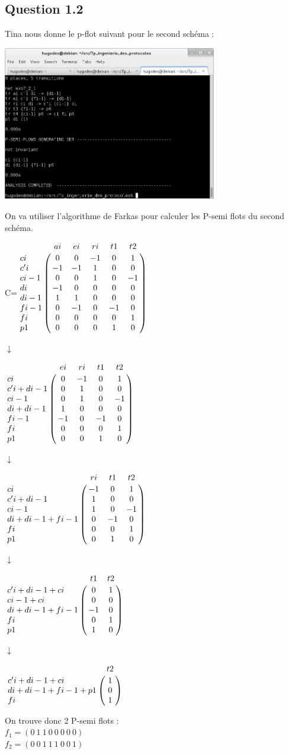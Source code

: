 \subsection{Question 1.2}
Tina nous donne le p-flot suivant pour le second schéma :\\

\begin{center}

\includegraphics[width=0.7\textwidth]{exo7/tina_7_2.png}\\

\end{center}

On va utiliser l'algorithme de Farkas pour calculer les P-semi flots du second schéma.

\begin{center}


{\Huge C}\qquad =\qquad $\bordermatrix{
&ai&ei&ri&t1&t2\cr
ci&0&0&-1&0&1\cr
c'i&-1&-1&1&0&0\cr
ci-1&0&0&1&0&-1\cr
di&-1&0&0&0&0\cr
di-1&1&1&0&0&0\cr
fi-1&0&-1&0&-1&0\cr
fi&0&0&0&0&1\cr
p1&0&0&0&1&0\cr
}$

{\Huge $\downarrow$}

$\bordermatrix{
&ei&ri&t1&t2\cr
ci&0&-1&0&1\cr
c'i+di-1&0&1&0&0\cr
ci-1&0&1&0&-1\cr
di+di-1&1&0&0&0\cr
fi-1&-1&0&-1&0\cr
fi&0&0&0&1\cr
p1&0&0&1&0\cr
}$

{\Huge $\downarrow$}

$\bordermatrix{
&ri&t1&t2\cr
ci&-1&0&1\cr
c'i+di-1&1&0&0\cr
ci-1&1&0&-1\cr
di+di-1+fi-1&0&-1&0\cr
fi&0&0&1\cr
p1&0&1&0\cr
}$

{\Huge $\downarrow$}

$\bordermatrix{
&t1&t2\cr
c'i+di-1+ci&0&1\cr
ci-1+ci&0&0\cr
di+di-1+fi-1&-1&0\cr
fi&0&1\cr
p1&1&0\cr
}$

{\Huge $\downarrow$}

$\bordermatrix{
&t2\cr
c'i+di-1+ci&1\cr
di+di-1+fi-1+p1&0\cr
fi&1\cr
}$

\vspace{1cm}

On trouve donc 2 P-semi flots :\\
$f_1 = (0\ 1\ 1\ 0\ 0\ 0\ 0\ 0)$\\
$f_2 = (0\ 0\ 1\ 1\ 1\ 0\ 0\ 1)$\\

\end{center}

